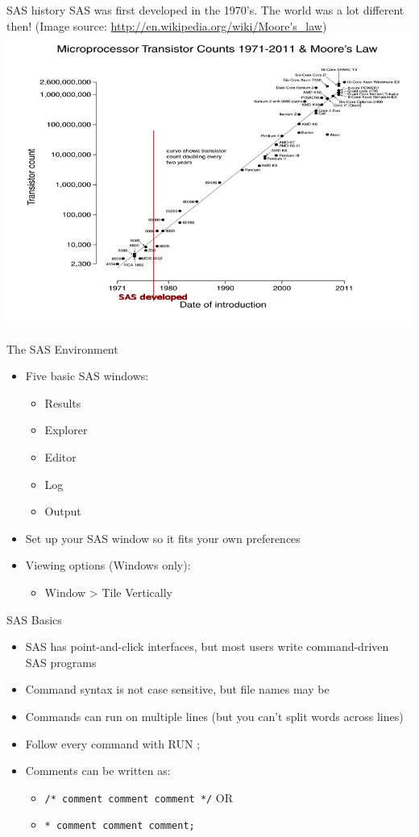 \documentclass[table,smaller]{beamer}
\begin{document}
\begin{frame}[label=sec-1-4]{SAS history}
SAS was first developed in the 1970's. The world was a lot different then!
(Image source: \url{http://en.wikipedia.org/wiki/Moore's_law})
\includegraphics[width=.9\linewidth]{./images/SASinContext.png}
\end{frame}
\begin{frame}[label=sec-1-5]{The SAS Environment}
\begin{itemize}
\item Five basic SAS windows:
\begin{itemize}
\item Results
\item Explorer
\item Editor
\item Log
\item Output
\end{itemize}
\item Set up your SAS window so it fits your own preferences
\item Viewing options (Windows only):
\begin{itemize}
\item Window > Tile Vertically
\end{itemize}
\end{itemize}
\end{frame}
\begin{frame}[fragile,label=sec-1-6]{SAS Basics}
 \begin{itemize}
\item SAS has point-and-click interfaces, but most users write command-driven SAS programs
\item Command syntax is not case sensitive, but file names may be
\item Commands can run on multiple lines (but you can't split words across lines)
\item Follow every command with RUN ;
\item Comments can be written as:
\begin{itemize}
\item \verb~/* comment comment comment */~ OR
\item \verb~* comment comment comment;~
\end{itemize}
\end{itemize}
\end{frame}
\end{document}
